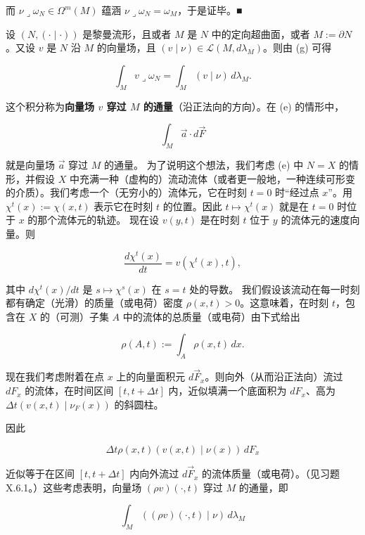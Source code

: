 \begin{remark}
\begin{items}
而 $ \nu \lrcorner \omega_N \in \Omega^m(M) $ 蕴涵 $ \nu \lrcorner \omega_N = \omega_M $，于是证毕。\nobreak\hspace{0.35em}■

\item[（h）]

设 $ (N, (\cdot \mid \cdot)) $ 是黎曼流形，且或者 $ M $ 是 $ N $ 中的定向超曲面，或者 $ M := \partial N $。又设 $ v $ 是 $ N $ 沿 $ M $ 的向量场，且 $ (v \mid \nu) \in \mathcal{L}(M, d\lambda_M) $。则由 (g) 可得

\[
\int_M v \lrcorner \omega_N = \int_M (v \mid \nu) \, d\lambda_M .
\]

这个积分称为\textbf{向量场 $ v $ 穿过 $ M $ 的通量}（沿正法向的方向）。在 (e) 的情形中，

\[
\int_M \vec{a} \cdot d\vec{F}
\]

就是向量场 $ \vec{a} $ 穿过 $ M $ 的通量。
为了说明这个想法，我们考虑 (e) 中 $ N = X $ 的情形，并假设 $ X $ 中充满一种（虚构的）流动流体（或者更一般地，一种连续可形变的介质）。我们考虑一个（无穷小的）流体元，它在时刻 $ t = 0 $ 时“经过点 $ x $”。用 $ \chi^t(x) := \chi(x,t) $ 表示它在时刻 $ t $ 的位置。因此 $ t \mapsto \chi^t(x) $ 就是在 $ t = 0 $ 时位于 $ x $ 的那个流体元的轨迹。
现在设 $ v(y,t) $ 是在时刻 $ t $ 位于 $ y $ 的流体元的速度向量。则

\[
\frac{d\chi^t(x)}{dt} = v(\chi^t(x), t) ,
\]

其中 $ d\chi^t(x)/dt $ 是 $ s \mapsto \chi^s(x) $ 在 $ s = t $ 处的导数。
我们假设该流动在每一时刻都有确定（光滑）的质量（或电荷）密度 $ \rho(x,t) > 0 $。这意味着，在时刻 $ t $，包含在 $ X $ 的（可测）子集 $ A $ 中的流体的总质量（或电荷）由下式给出

\[
\rho(A,t) := \int_A \rho(x,t) \, dx .
\]
\end{items}


现在我们考虑附着在点 $ x $ 上的向量面积元 $ d\vec{F}_x $。则向外（从而沿正法向）流过 $ dF_x $ 的流体，在时间区间 $ [t, t + \Delta t] $ 内，近似填满一个底面积为 $ dF_x $、高为 $ \Delta t(v(x,t) \mid \nu_F(x)) $ 的斜圆柱。

因此

\[
\Delta t \rho(x,t)(v(x,t) \mid \nu(x)) \, dF_x
\]

近似等于在区间 $ [t, t + \Delta t] $ 内向外流过 $ d\vec{F}_x $ 的流体质量（或电荷）。（见习题 X.6.1。）这些考虑表明，向量场 $ (\rho v)(\cdot, t) $ 穿过 $ M $ 的通量，即

\[
\int_M ((\rho v)(\cdot, t) \mid \nu) \, d\lambda_M
\]


\end{remark}
